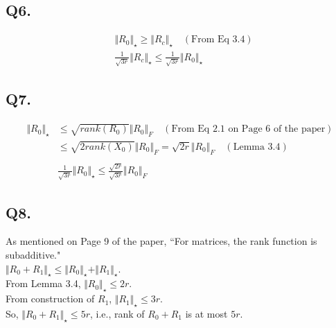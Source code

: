 \documentclass[fleqn, 11pt]{article}
\begin{document}
\subsection*{Q6.}
\begin{equation*}
    \begin{aligned}
        & \Vert R_0 \Vert_\star \ge \Vert R_c \Vert_\star \quad (\text{From Eq 3.4}) \\
        & \frac{1}{\sqrt{3r}} \Vert R_c \Vert_\star \le \frac{1}{\sqrt{3r}} \Vert R_0 \Vert_\star
    \end{aligned}
\end{equation*}

\subsection*{Q7.}
\begin{equation*}
    \begin{aligned}
        \Vert R_0 \Vert_\star &\le \sqrt{rank(R_0)} \Vert R_0 \Vert_F \quad (\text{From Eq 2.1 on Page 6 of the paper}) \\
            &\le \sqrt{2rank(X_0)} \Vert R_0 \Vert_F = \sqrt{2r} \Vert R_0 \Vert_F \quad (\text{Lemma 3.4}) \\ \\
            & \frac{1}{\sqrt{3r}} \Vert R_0 \Vert_\star \le \frac{\sqrt{2r}}{\sqrt{3r}} \Vert R_0 \Vert_F
    \end{aligned}
\end{equation*}

\subsection*{Q8.}
As mentioned on Page 9 of the paper, ``For matrices, the rank function is subadditive." \\
$\Vert R_0 + R_1 \Vert_\star \le \Vert R_0 \Vert_\star + \Vert R_1 \Vert_\star$. \\
From Lemma 3.4, $\Vert R_0 \Vert_\star \le 2r$. \\
From construction of $R_1$, $\Vert R_1 \Vert_\star \le 3r$. \\
So, $\Vert R_0 + R_1 \Vert_\star \le 5r$, i.e., rank of $R_0 + R_1$ is at most $5r$.
\end{document}
